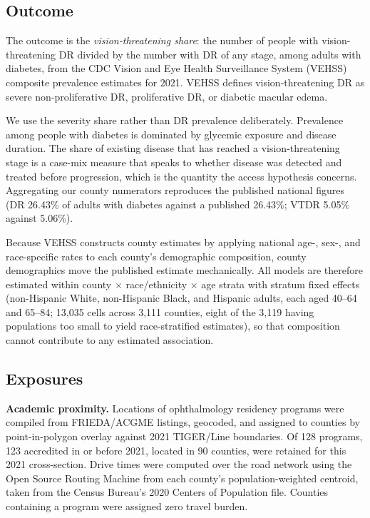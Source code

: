 \documentclass[11pt]{article}
\begin{document}
\subsection{Outcome}

The outcome is the \emph{vision-threatening share}: the number of people with
vision-threatening DR divided by the number with DR of any stage, among adults
with diabetes, from the CDC Vision and Eye Health Surveillance System (VEHSS)
composite prevalence estimates for 2021.\citep{vehss,lundeen2023} VEHSS defines
vision-threatening DR as severe non-proliferative DR, proliferative DR, or
diabetic macular edema.

We use the severity share rather than DR prevalence deliberately. Prevalence
among people with diabetes is dominated by glycemic exposure and disease
duration. The share of existing disease that has reached a vision-threatening
stage is a case-mix measure that speaks to whether disease was detected and
treated before progression, which is the quantity the access hypothesis
concerns. Aggregating our county numerators reproduces the published national
figures (DR 26.43\% of adults with diabetes against a published 26.43\%; VTDR
5.05\% against 5.06\%).

Because VEHSS constructs county estimates by applying national age-, sex-, and
race-specific rates to each county's demographic composition, county demographics
move the published estimate mechanically.\citep{lundeen2023} All models are
therefore estimated within county $\times$ race/ethnicity $\times$ age strata
with stratum fixed effects (non-Hispanic White, non-Hispanic Black, and Hispanic
adults, each aged 40--64 and 65--84; 13,035 cells across 3,111 counties, eight
of the 3,119 having populations too small to yield race-stratified estimates),
so that composition cannot contribute to any estimated association.

\subsection{Exposures}

\textbf{Academic proximity.} Locations of ophthalmology residency programs were
compiled from FRIEDA/ACGME listings, geocoded, and assigned to counties by
point-in-polygon overlay against 2021 TIGER/Line boundaries. Of 128 programs,
123 accredited in or before 2021, located in 90 counties, were retained for this
2021 cross-section. Drive times were computed over the road network using the
Open Source Routing Machine from each county's population-weighted centroid,
taken from the Census Bureau's 2020 Centers of Population file.\citep{cenpop}
Counties containing a program were assigned zero travel burden.
\end{document}
